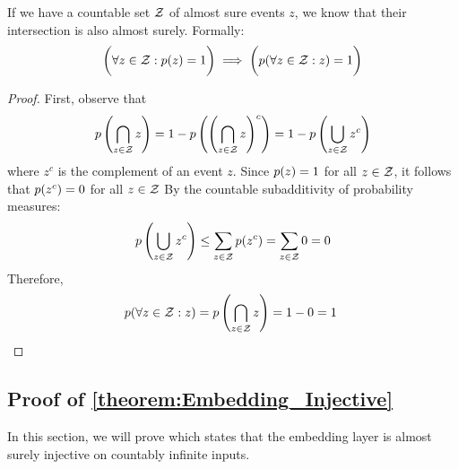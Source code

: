 \newcommand{\someRandomVariable}{z}
\begin{lemma}\label{theorem:countable_intersection_almost_sure}
    If we have a countable set $\mathcal{Z}$ of almost sure events $\someRandomVariable$, 
    we know that their intersection is also almost surely. Formally:
    \begin{align}
        \bigg(\forall \someRandomVariable\in \calZ:\prob(z)=1 \bigg) \implies \bigg(\prob(\forall \someRandomVariable\in\calZ:\someRandomVariable)=1 \bigg)
    \end{align}
\end{lemma}
\begin{proof}
    First, observe that
    \begin{align}
        \prob\left(\bigcap_{\someRandomVariable\in \calZ} \someRandomVariable\right)
        = 1 - \prob\left(\left(\bigcap_{\someRandomVariable \in \calZ} \someRandomVariable\right)^c\right)
        = 1 - \prob\left(\bigcup_{\someRandomVariable \in \calZ} \someRandomVariable^c\right)
    \end{align}
    where $\someRandomVariable^c$ is the complement of an event $\someRandomVariable$. Since \( \prob(\someRandomVariable) = 1 \) for all \( \someRandomVariable \in \calZ \), it follows that \( \prob(\someRandomVariable^c) = 0 \) for all \( \someRandomVariable \in \calZ \) 
    By the countable subadditivity of probability measures:
    \begin{align}
        \prob\left(\bigcup_{\someRandomVariable \in \calZ} \someRandomVariable^c\right)
        \leq \sum_{\someRandomVariable \in \calZ} \prob(\someRandomVariable^c)
        = \sum_{\someRandomVariable \in \calZ} 0 = 0
    \end{align}
    Therefore,
    \begin{align}
        \prob(\forall \someRandomVariable\in\calZ:\someRandomVariable) = \prob\left(\bigcap_{\someRandomVariable \in \calZ} \someRandomVariable\right) = 1 - 0 = 1\ \qedhere
    \end{align}
\end{proof}

\subsection{\texorpdfstring{Proof of \cref{theorem:Embedding_Injective}}{Theorem}}\label{appsubsec:proof_injective_Embedding}
In this section, we will prove  which states that the embedding layer is almost surely injective on countably infinite inputs.

